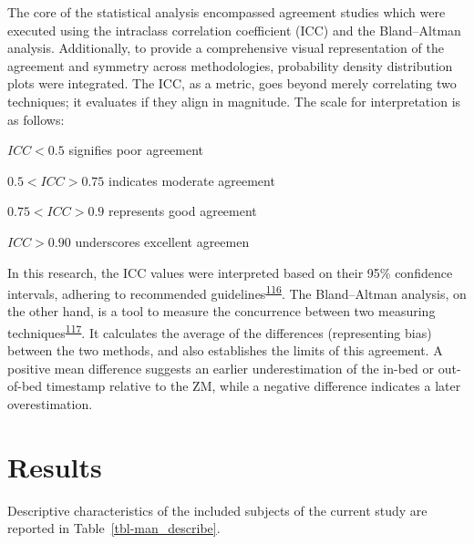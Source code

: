 \documentclass[
  10pt,
]{scrbook}
\begin{document}
The core of the statistical analysis encompassed agreement studies which
were executed using the intraclass correlation coefficient (ICC) and the
Bland--Altman analysis. Additionally, to provide a comprehensive visual
representation of the agreement and symmetry across methodologies,
probability density distribution plots were integrated. The ICC, as a
metric, goes beyond merely correlating two techniques; it evaluates if
they align in magnitude. The scale for interpretation is as follows:

\(ICC < 0.5\) signifies poor agreement

\(0.5 < ICC > 0.75\) indicates moderate agreement

\(0.75 < ICC > 0.9\) represents good agreement

\(ICC > 0.90\) underscores excellent agreemen

In this research, the ICC values were interpreted based on their 95\%
confidence intervals, adhering to recommended
guidelines\textsuperscript{\protect\hyperlink{ref-koo_guideline_2016}{116}}.
The Bland--Altman analysis, on the other hand, is a tool to measure the
concurrence between two measuring
techniques\textsuperscript{\protect\hyperlink{ref-bland_measuring_1999}{117}}.
It calculates the average of the differences (representing bias) between
the two methods, and also establishes the limits of this agreement. A
positive mean difference suggests an earlier underestimation of the
in-bed or out-of-bed timestamp relative to the ZM, while a negative
difference indicates a later overestimation.

\hypertarget{results}{%
\section{Results}\label{results}}

Descriptive characteristics of the included subjects of the current
study are reported in Table~\ref{tbl-man_describe}.

\begingroup

\footnotesize
\end{document}
